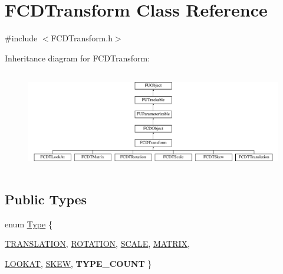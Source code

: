 \hypertarget{classFCDTransform}{
\section{FCDTransform Class Reference}
\label{classFCDTransform}
}


{\ttfamily \#include $<$FCDTransform.h$>$}

Inheritance diagram for FCDTransform:\begin{figure}[H]
\begin{center}
\leavevmode
\includegraphics[height=4.409449cm]{classFCDTransform}
\end{center}
\end{figure}
\subsection*{Public Types}
\begin{DoxyCompactItemize}
\item 
enum \hyperlink{classFCDTransform_a13e561c5e53aeaf84dedf4661cdc8921}{Type} \{ \par
\hyperlink{classFCDTransform_a13e561c5e53aeaf84dedf4661cdc8921a7e6c276586b7bbb02f2b4a93a9581873}{TRANSLATION}, 
\hyperlink{classFCDTransform_a13e561c5e53aeaf84dedf4661cdc8921af978abed37815c8a60a1c76745767eb6}{ROTATION}, 
\hyperlink{classFCDTransform_a13e561c5e53aeaf84dedf4661cdc8921aca207c4221523864b49deac186a4bd05}{SCALE}, 
\hyperlink{classFCDTransform_a13e561c5e53aeaf84dedf4661cdc8921a79c19319d29f4eb2afa8ab313fe2792d}{MATRIX}, 
\par
\hyperlink{classFCDTransform_a13e561c5e53aeaf84dedf4661cdc8921a381eafef1b7eb3501ae84f5e19071a35}{LOOKAT}, 
\hyperlink{classFCDTransform_a13e561c5e53aeaf84dedf4661cdc8921a64a79e08a191d674915594b9bdbeb6ad}{SKEW}, 
{\bfseries TYPE\_\-COUNT}
 \}
\end{DoxyCompactItemize}
